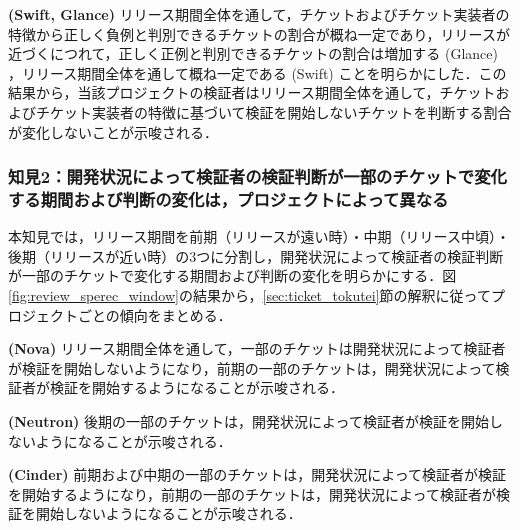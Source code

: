\documentclass[11pt]{jreport}
\begin{document}
\textbf{ (Swift, Glance) }リリース期間全体を通して，チケットおよびチケット実装者の特徴から正しく負例と判別できるチケットの割合が概ね一定であり，リリースが近づくにつれて，正しく正例と判別できるチケットの割合は増加する (Glance) ，リリース期間全体を通して概ね一定である (Swift) ことを明らかにした．この結果から，当該プロジェクトの検証者はリリース期間全体を通して，チケットおよびチケット実装者の特徴に基づいて検証を開始しないチケットを判断する割合が変化しないことが示唆される．

\begin{table}[t]
\caption{各プロジェクトの検証予測モデルにおける再現率（再掲），特異度の回帰係数の分類}
\label{table:review_spec_jikeiretsu}
\centering
\vspace{0.5zh}
\end{table}

\subsubsection{知見2：開発状況によって検証者の検証判断が一部のチケットで変化する期間および判断の変化は，プロジェクトによって異なる}
本知見では，リリース期間を前期（リリースが遠い時）・中期（リリース中頃）・後期（リリースが近い時）の3つに分割し，開発状況によって検証者の検証判断が一部のチケットで変化する期間および判断の変化を明らかにする．図\ref{fig:review_sperec_window}の結果から，\ref{sec:ticket_tokutei}節の解釈に従ってプロジェクトごとの傾向をまとめる．

\textbf{ (Nova) }リリース期間全体を通して，一部のチケットは開発状況によって検証者が検証を開始しないようになり，前期の一部のチケットは，開発状況によって検証者が検証を開始するようになることが示唆される．

\textbf{ (Neutron) }後期の一部のチケットは，開発状況によって検証者が検証を開始しないようになることが示唆される．

\textbf{ (Cinder) }前期および中期の一部のチケットは，開発状況によって検証者が検証を開始するようになり，前期の一部のチケットは，開発状況によって検証者が検証を開始しないようになることが示唆される．
\end{document}
